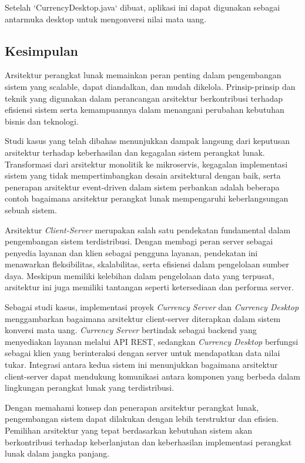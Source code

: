Setelah `CurrencyDesktop.java` dibuat, aplikasi ini dapat digunakan sebagai antarmuka desktop untuk mengonversi nilai mata uang.

\subsection{Kesimpulan}

Arsitektur perangkat lunak memainkan peran penting dalam pengembangan sistem yang scalable, dapat diandalkan, dan mudah dikelola. Prinsip-prinsip dan teknik yang digunakan dalam perancangan arsitektur berkontribusi terhadap efisiensi sistem serta kemampuannya dalam menangani perubahan kebutuhan bisnis dan teknologi.

Studi kasus yang telah dibahas menunjukkan dampak langsung dari keputusan arsitektur terhadap keberhasilan dan kegagalan sistem perangkat lunak. Transformasi dari arsitektur monolitik ke mikroservis, kegagalan implementasi sistem yang tidak mempertimbangkan desain arsitektural dengan baik, serta penerapan arsitektur event-driven dalam sistem perbankan adalah beberapa contoh bagaimana arsitektur perangkat lunak mempengaruhi keberlangsungan sebuah sistem.

Arsitektur \textit{Client-Server} merupakan salah satu pendekatan fundamental dalam pengembangan sistem terdistribusi. Dengan membagi peran server sebagai penyedia layanan dan klien sebagai pengguna layanan, pendekatan ini menawarkan fleksibilitas, skalabilitas, serta efisiensi dalam pengelolaan sumber daya. Meskipun memiliki kelebihan dalam pengelolaan data yang terpusat, arsitektur ini juga memiliki tantangan seperti ketersediaan dan performa server.

Sebagai studi kasus, implementasi proyek \textit{Currency Server} dan \textit{Currency Desktop} menggambarkan bagaimana arsitektur client-server diterapkan dalam sistem konversi mata uang. \textit{Currency Server} bertindak sebagai backend yang menyediakan layanan melalui API REST, sedangkan \textit{Currency Desktop} berfungsi sebagai klien yang berinteraksi dengan server untuk mendapatkan data nilai tukar. Integrasi antara kedua sistem ini menunjukkan bagaimana arsitektur client-server dapat mendukung komunikasi antara komponen yang berbeda dalam lingkungan perangkat lunak yang terdistribusi.

Dengan memahami konsep dan penerapan arsitektur perangkat lunak, pengembangan sistem dapat dilakukan dengan lebih terstruktur dan efisien. Pemilihan arsitektur yang tepat berdasarkan kebutuhan sistem akan berkontribusi terhadap keberlanjutan dan keberhasilan implementasi perangkat lunak dalam jangka panjang.
